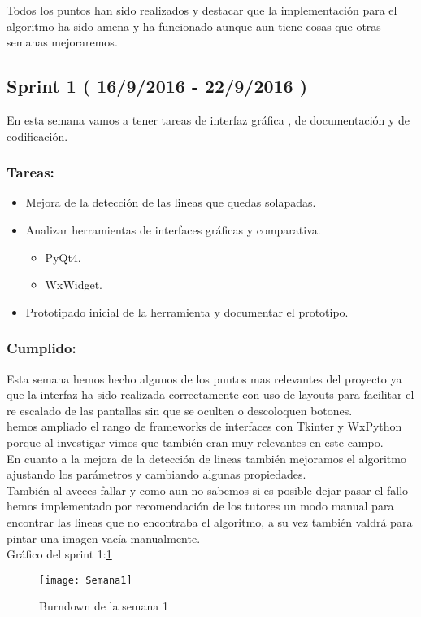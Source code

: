 Todos los puntos han sido realizados y destacar que la implementación para el algoritmo ha sido amena y ha funcionado aunque aun tiene cosas que otras semanas mejoraremos.

\subsection{Sprint 1 ( 16/9/2016 - 22/9/2016 )}
 En esta semana vamos a tener tareas de interfaz gráfica , de documentación y de codificación.
\subsubsection{Tareas:}
\begin{itemize}
\item Mejora de la detección de las lineas que quedas solapadas. 
\item Analizar herramientas de interfaces gráficas y comparativa.
	\begin{itemize}
	\item PyQt4. 
	\item WxWidget.
	\end{itemize}
\item Prototipado inicial de la herramienta y documentar el prototipo.
\end{itemize}



\subsubsection{Cumplido:}
Esta semana hemos hecho algunos de los puntos mas relevantes del proyecto ya que la interfaz ha sido realizada correctamente con uso de layouts para facilitar el re escalado de las pantallas sin que se oculten o descoloquen botones.\\
hemos ampliado el rango de frameworks de interfaces con Tkinter y WxPython porque al investigar vimos que también eran muy relevantes en este campo.\\
En cuanto a la mejora de la detección de lineas también mejoramos el algoritmo ajustando los parámetros y cambiando algunas propiedades.\\
También al aveces fallar y como aun no sabemos si es posible dejar pasar el fallo hemos implementado por recomendación de los tutores un modo manual para encontrar las lineas que no encontraba el algoritmo, a su vez también valdrá para pintar una imagen vacía manualmente.\\
Gráfico del sprint 1:\ref{fig:A.2.1}
\begin{figure}[h]
\centering
\texttt{[image: Semana1]}
\caption{Burndown de la semana 1}
\label{fig:A.2.1}
\end{figure}

